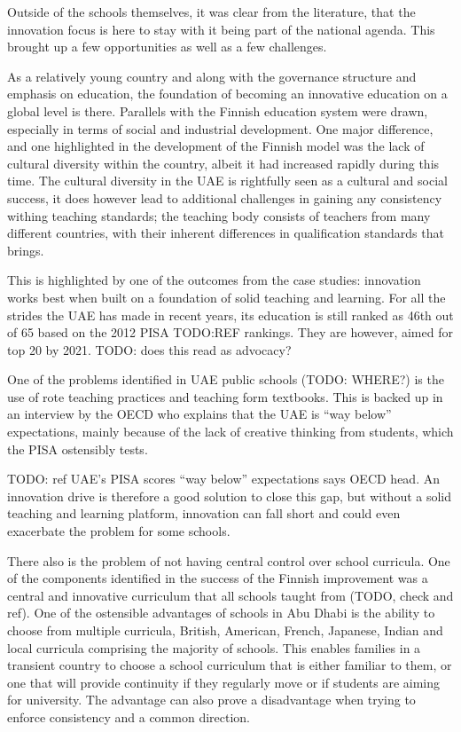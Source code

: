 Outside of the schools themselves, it was clear from the literature, that the innovation focus is here to stay with it being part of the national agenda. This brought up a few opportunities as well as a few challenges.

As a relatively young country and along with the governance structure and emphasis on education, the foundation of becoming an innovative education on a global level is there. Parallels with the Finnish education system were drawn, especially in terms of social and industrial development. One major difference, and one highlighted in the development of the Finnish model was the lack of cultural diversity within the country, albeit it had increased rapidly during this time. The cultural diversity in the UAE is rightfully seen as a cultural and social success, it does however lead to additional challenges in gaining any consistency withing teaching standards; the teaching body consists of teachers from many different countries, with their inherent differences in qualification standards that brings.

This is highlighted by one of the outcomes from the case studies: innovation works best when built on a foundation of solid teaching and learning. For all the strides the UAE has made in recent years, its education is still ranked as 46th out of 65 based on the 2012 PISA TODO:REF rankings. They are however, aimed for top 20 by 2021. TODO: does this read as advocacy?

One of the problems identified in UAE public schools (TODO: WHERE?) is the use of rote teaching practices and teaching form textbooks. This is backed up in an interview by the OECD who explains that the UAE is “way below” expectations, mainly because of the lack of creative thinking from students, which the PISA ostensibly tests.

TODO: ref UAE’s PISA scores “way below” expectations says OECD head.
An innovation drive is therefore a good solution to close this gap, but without a solid teaching and learning platform, innovation can fall short and could even exacerbate the problem for some schools.

There also is the problem of not having central control over school curricula. One of the components identified in the success of the Finnish improvement was a central and innovative curriculum that all schools taught from (TODO, check and ref). One of the ostensible advantages of schools in Abu Dhabi is the ability to choose from multiple curricula, British, American, French, Japanese, Indian and local curricula comprising the majority of schools. This enables families in a transient country to choose a school curriculum that is either familiar to them, or one that will provide continuity if they regularly move or if students are aiming for university. The advantage can also prove a disadvantage when trying to enforce consistency and a common direction.

